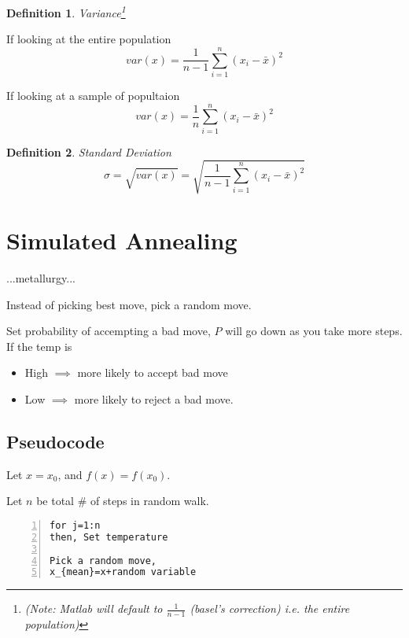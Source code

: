 \documentclass[12pt]{book}
\newtheorem*{defn*}{Definition}
\begin{document}
\begin{defn*}Variance\footnote[1]{(Note: Matlab will default to $\frac{1}{n-1}$ (basel's correction) i.e. the entire population)}\\
\end{defn*}
\indent If looking at the entire population
$$var(x)=\frac{1}{n-1} \sum\limits_{i=1}^{n} (x_{i}-\bar{x})^{2}$$


If looking at a sample of popultaion
$$var(x)=\frac{1}{n} \sum\limits_{i=1}^{n} (x_{i}-\bar{x})^{2}$$



\begin{defn*}Standard Deviation
$$\sigma = \sqrt{var(x)}=\sqrt{\frac{1}{n-1} \sum\limits_{i=1}^{n} (x_{i}-\bar{x})^{2}}$$
\end{defn*}







\chapter{Simulated Annealing}

...metallurgy...

\noindent Instead of picking best move, pick a random move. 

Set probability of accempting a bad move, $P$ will go down as you take more steps. \\

\noindent If the temp is
\begin{itemize}
\item High $\implies{}$ more likely to accept bad move
\item Low $\implies{}$ more likely to reject a bad move.
\end{itemize}


\newpage
\section{Pseudocode}

Let $x=x_{0}$, and $f(x)=f(x_{0})$.

Let $n$ be total $\#$ of steps in random walk.


\begin{Verbatim}[numbers=left, frame=single, formatcom=\color{black}]
for j=1:n
then, Set temperature

Pick a random move, 
x_{mean}=x+random variable
\end{Verbatim}





\backmatter
%
\begin{thebibliography}{99}
\end{thebibliography}
\end{document}
